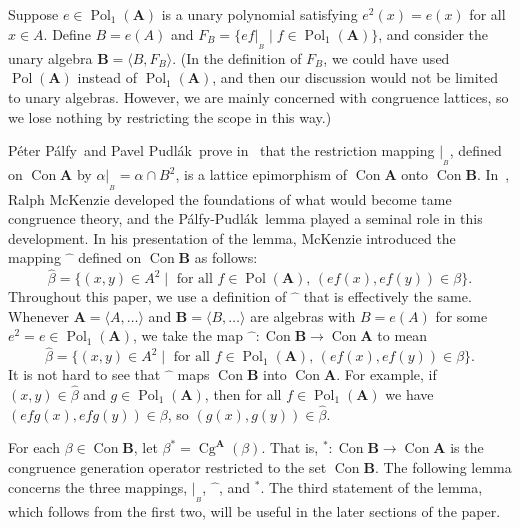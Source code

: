 \documentclass{au}
\numberwithin{equation}{section}
\theoremstyle{plain}
\theoremstyle{definition}
\newcommand{\suchthat}{\ensuremath{\mid}}  %
\newcommand{\Palfy}{P\'alfy}
\newcommand{\Pudlak}{Pudl\'ak}
\newcommand{\PP}{P\'alfy-Pudl\'ak}
\newcommand{\<}{\ensuremath{\langle}}
\renewcommand{\>}{\ensuremath{\rangle}}
\newcommand{\bA}{\ensuremath{\mathbf{A}}}
\newcommand{\bB}{\ensuremath{\mathbf{B}}}
\DeclareMathOperator{\Cg}{Cg}
\DeclareMathOperator{\Con}{Con}
\DeclareMathOperator{\Pol}{Pol}
\newcommand{\resB}{\ensuremath{|_{_B}}}
\newcommand{\hatmap}{\ensuremath{\widehat{\phantom{x}}}} %
\begin{document}
Suppose $e \in \Pol_1(\bA)$ is a unary polynomial satisfying $e^2(x) = e(x)$ for
all $x\in A$.  Define $B=e(A)$ and
$F_B = \{ef\resB \suchthat f\in \Pol_1(\bA)\}$, and consider the
unary algebra $\bB= \<B, F_B\>$. %
(In the definition of  $F_B$, we could have used
$\Pol(\bA)$ instead of $\Pol_1(\bA)$, and then our discussion would not be
limited to unary algebras.  However, we are mainly concerned with
congruence lattices, so we lose nothing by restricting the scope in this way.)%

P\'eter \Palfy\ and
Pavel \Pudlak\
prove in~\cite[Lemma~1]{Palfy:1980} that
the restriction mapping $\resB$, defined on $\Con\bA$ by
$\alpha\resB = \alpha \cap B^2$, is a lattice epimorphism of $\Con\bA$ onto $\Con\bB$.
In~\cite{McKenzie:1983}, Ralph McKenzie
developed the foundations of what would become tame congruence theory, and
the \PP\ lemma played a seminal role in this development.  In his presentation
of the lemma, McKenzie introduced the mapping $\hatmap$ defined on $\Con\bB$ as follows:
\[
\widehat{\beta} = \{(x,y) \in A^2 \suchthat  \text{ for all } f\in \Pol(\bA), \,
(ef(x), ef(y))\in \beta\}.
\]
Throughout this paper, we use a definition of $\hatmap$ that is effectively
the same.  Whenever $\bA = \< A, \dots\>$
 and $\bB = \< B, \dots\>$ are algebras with $B = e(A)$ for some
$e^2 = e \in \Pol_1(\bA)$,  we take the map
$\hatmap %
\colon \Con\bB \rightarrow \Con\bA$ to mean
\begin{equation}
  \label{eq:hatmap}
\widehat{\beta} = \{(x,y) \in A^2 \suchthat \text{ for all }
f\in \Pol_1(\bA), \, (ef(x), ef(y))\in \beta \}.
\end{equation}
It is not hard to see that $\hatmap$ maps $\Con\bB$ into $\Con\bA$.  For
example, if $(x,y) \in \widehat{\beta}$ and $g\in \Pol_1(\bA)$, then for all $f\in \Pol_1(\bA)$ we
have $(efg(x),efg(y)) \in \beta$, so $(g(x),g(y))\in \widehat{\beta}$.

For each $\beta \in \Con\bB$, let $\beta^* = \Cg^\bA(\beta)$.  That is,
$^* %
\colon \Con\bB \rightarrow \Con\bA$ is
the congruence generation operator restricted to the set $\Con\bB$.
The following lemma concerns the three mappings, $\resB$, $\hatmap$, and $^*$.
The third statement of the lemma, which follows from the first two,
will be useful in the later sections of the paper.
\end{document}
